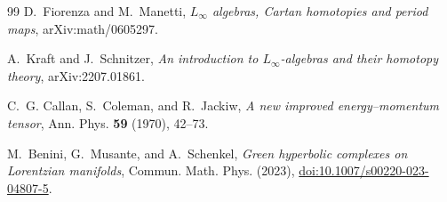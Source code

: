 \documentclass[11pt]{article}
\theoremstyle{definition}
\theoremstyle{remark}
\begin{document}
\begin{thebibliography}{99}
D.~Fiorenza and M.~Manetti,
\emph{$L_\infty$ algebras, Cartan homotopies and period maps},
arXiv:math/0605297.

A.~Kraft and J.~Schnitzer,
\emph{An introduction to $L_\infty$-algebras and their homotopy theory},
arXiv:2207.01861.

C.~G. Callan, S.~Coleman, and R.~Jackiw,
\emph{A new improved energy--momentum tensor},
Ann. Phys. \textbf{59} (1970), 42--73.

M.~Benini, G.~Musante, and A.~Schenkel,
\emph{Green hyperbolic complexes on Lorentzian manifolds},
Commun. Math. Phys. (2023),
\href{https://doi.org/10.1007/s00220-023-04807-5}
{doi:10.1007/s00220-023-04807-5}.

\end{thebibliography}
\end{document}
